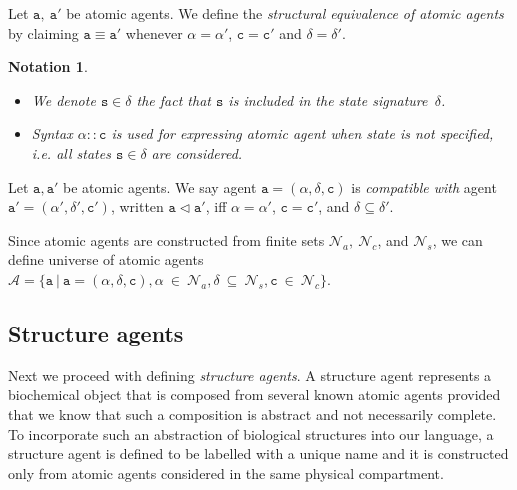 \documentclass{entcs}
\renewcommand{\~}[0]{\texttildelow}
\newtheorem{notation}[thm]{Notation}
\begin{document}
\begin{definition}
Let $\mathtt{a},~\mathtt{a}'$ be atomic agents. We define the \emph{structural equivalence of atomic agents} by claiming $\mathtt{a}\equiv\mathtt{a}'$ whenever $\mathtt{\alpha} = \mathtt{\alpha}'$, $\mathtt{c} = \mathtt{c}'$ and $\delta = \delta'$.
\end{definition}

\begin{notation}
{~}
\begin{itemize}
\item We denote $\mathtt{s}\in\delta$ the fact that $\mathtt{s}$ is included in the state signature~$\delta$.
\item Syntax $\alpha::\mathtt{c}$ is used for expressing atomic agent when state is not specified, i.e. all states $\mathtt{s} \in \delta$ are considered.
\end{itemize}
\end{notation}

\begin{defn}
Let $\mathtt{a},\mathtt{a}'$ be atomic agents. We say agent $\mathtt{a}=(\alpha, \delta, \mathtt{c})$ is \emph{compatible with} agent $\mathtt{a}'=(\alpha', \delta', \mathtt{c}')$, written $\mathtt{a} \lhd \mathtt{a}'$, iff $\alpha = \alpha'$, $\mathtt{c} = \mathtt{c}'$, and $\delta \subseteq \delta'$. 
\end{defn}

\begin{theorem}
Since atomic agents are constructed from finite sets $\mathcal{N}_{a},~\mathcal{N}_{c}$, and $\mathcal{N}_{s}$, we can define universe of atomic agents $\mathcal{A} = \{ \mathtt{a}~|~\mathtt{a} = (\alpha, \delta, \mathtt{c}), \alpha~\in~\mathcal{N}_{a}, \delta~\subseteq~\mathcal{N}_{s},  \mathtt{c}~\in~\mathcal{N}_{c} \}$.
\end{theorem}

\subsection{Structure agents}

Next we proceed with defining \emph{structure agents}. A structure agent represents a biochemical object that is composed from several known atomic agents provided that we know that such a composition is abstract and not necessarily complete. To incorporate such an abstraction of biological structures into our language, a structure agent is defined to be labelled with a unique name and it is constructed only from atomic agents considered in the same physical compartment. 
\end{document}
